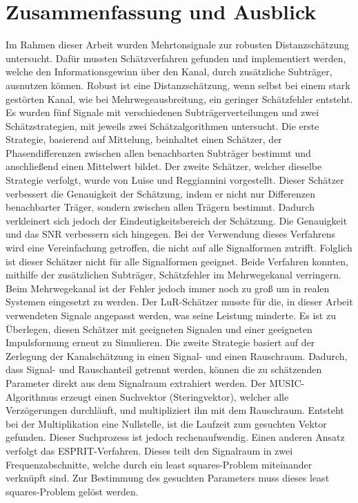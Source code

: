 \chapter{Zusammenfassung und Ausblick}
\label{chap:Schluss}

Im Rahmen dieser Arbeit wurden Mehrtonsignale zur robusten Distanzschätzung untersucht. Dafür mussten Schätzverfahren gefunden und implementiert werden, welche den Informationsgewinn über den Kanal, durch zusätzliche Subträger, ausnutzen können. Robust ist eine Distanzschätzung, wenn selbst bei einem stark gestörten Kanal, wie bei Mehrwegeausbreitung, ein geringer Schätzfehler entsteht. Es wurden fünf Signale mit verschiedenen Subträgerverteilungen und zwei Schätzstrategien, mit jeweils zwei Schätzalgorithmen untersucht. Die erste Strategie, basierend auf Mittelung, beinhaltet einen Schätzer, der Phasendifferenzen zwischen allen benachbarten Subträger bestimmt und anschließend einen Mittelwert bildet. Der zweite Schätzer, welcher dieselbe Strategie verfolgt, wurde von Luise und Reggiannini vorgestellt. Dieser Schätzer verbessert die Genauigkeit der Schätzung, indem er nicht nur Differenzen benachbarter Träger, sondern zwischen allen Trägern bestimmt. Dadurch verkleinert sich jedoch der Eindeutigkeitsbereich der Schätzung. Die Genauigkeit und das \gls{SNR} verbessern sich hingegen. Bei der Verwendung dieses Verfahrens wird eine Vereinfachung getroffen, die nicht auf alle Signalformen zutrifft. Folglich ist dieser Schätzer nicht für alle Signalformen geeignet. Beide Verfahren konnten, mithilfe der zusätzlichen Subträger, Schätzfehler im Mehrwegekanal verringern. Beim Mehrwegekanal ist der Fehler jedoch immer noch zu groß um in realen Systemen eingesetzt zu werden. Der \gls{LuR}-Schätzer musste für die, in dieser Arbeit verwendeten Signale angepasst werden, was seine Leistung minderte. Es ist zu Überlegen, diesen Schätzer mit geeigneten Signalen und einer geeigneten Impulsformung erneut zu Simulieren. 
Die zweite Strategie basiert auf der Zerlegung der Kanalschätzung in einen Signal- und einen Rauschraum. Dadurch, dass Signal- und Rauschanteil getrennt werden, können die zu schätzenden Parameter direkt aus dem Signalraum extrahiert werden. Der MUSIC-Algorithmus erzeugt einen Suchvektor (Steringvektor), welcher alle Verzögerungen durchläuft, und multipliziert ihn mit dem Rauschraum. Entsteht bei der Multiplikation eine Nullstelle, ist die Laufzeit zum gesuchten Vektor gefunden. Dieser Suchprozess ist jedoch rechenaufwendig. Einen anderen Ansatz verfolgt das ESPRIT-Verfahren. Dieses teilt den Signalraum in zwei Frequenzabschnitte, welche durch ein least squares-Problem miteinander verknüpft sind. Zur Bestimmung des gesuchten Parameters muss dieses least squares-Problem gelöst werden.  

